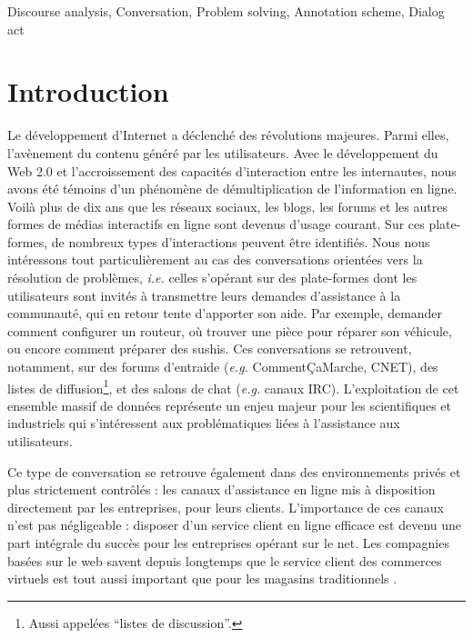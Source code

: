 \documentclass[10pt,a4paper,twoside]{article}
\newcommand{\quotes}[1]{``#1''}
\begin{document}
{Discourse analysis, Conversation, Problem solving, Annotation scheme, Dialog act}


\section{Introduction}
\label{sec:introduction}

Le développement d'Internet a déclenché des révolutions majeures. Parmi elles, l'avènement du contenu généré par les utilisateurs. Avec le développement du Web 2.0 et l'accroissement des capacités d'interaction entre les internautes, nous avons été témoins d'un phénomène de démultiplication de l'information en ligne. Voilà plus de dix ans que les réseaux sociaux, les blogs, les forums et les autres formes de médias interactifs en ligne sont devenus d'usage courant. Sur ces plate-formes, de nombreux types d'interactions peuvent être identifiés. Nous nous intéressons tout particulièrement au cas des conversations orientées vers la résolution de problèmes, \textit{i.e.} celles s'opérant sur des plate-formes dont les utilisateurs sont invités à transmettre leurs demandes d'assistance à la communauté, qui en retour tente d'apporter son aide. Par exemple, demander comment configurer un routeur, où trouver une pièce pour réparer son véhicule, ou encore comment préparer des sushis. Ces conversations se retrouvent, notamment, sur des forums d'entraide (\textit{e.g.} CommentÇaMarche, CNET), des listes de diffusion\footnote{Aussi appelées \quotes{listes de discussion}.}, et des salons de chat (\textit{e.g.} canaux IRC). L'exploitation de cet ensemble massif de données représente un enjeu majeur pour les scientifiques et industriels qui s'intéressent aux problématiques liées à l'assistance aux utilisateurs.

Ce type de conversation se retrouve également dans des environnements privés et plus strictement contrôlés : les canaux d'assistance en ligne mis à disposition directement par les entreprises, pour leurs clients. L'importance de ces canaux n'est pas négligeable : disposer d'un service client en ligne efficace est devenu une part intégrale du succès pour les entreprises opérant sur le net. Les compagnies basées sur le web savent depuis longtemps que le service client des commerces virtuels est tout aussi important que pour les magasins traditionnels \cite{bernett2000e}.
\end{document}
